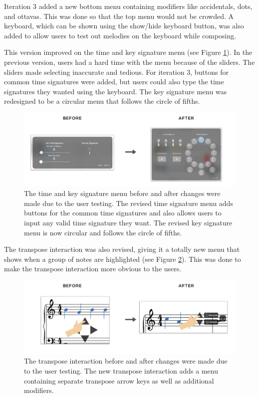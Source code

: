 				Iteration 3 added a new bottom menu containing modifiers like accidentals, dots, and ottavas. This was done so that the top menu would not be crowded. A keyboard, which can be shown using the show/hide keyboard button, was also added to allow users to test out melodies on the keyboard while composing. 

				This version improved on the time and key signature menu (see Figure \ref{fig:before-after-tsmenu}). In the previous version, users had a hard time with the menu because of the sliders. The sliders made selecting inaccurate and tedious. For iteration 3, buttons for common time signatures were added, but users could also type the time signatures they wanted using the keyboard. The key signature menu was redesigned to be a circular menu that follows the circle of fifths. 

				\begin{figure}[H]
					\centering
					\includegraphics[scale=0.28]{figures/before-after-tsmenu}
				    \caption{The time and key signature menu before and after changes were made due to the user testing. The revised time signature menu adds buttons for the common time signatures and also allows users to input any valid time signature they want. The revised key signature menu is now circular and follows the circle of fifths.}
				    \label{fig:before-after-tsmenu}
				\end{figure} 

				The transpose interaction was also revised, giving it a totally new menu that shows when a group of notes are highlighted (see Figure \ref{fig:before-after-transpose}). This was done to make the transpose interaction more obvious to the users.

				\begin{figure}[h]
					\centering
					\includegraphics[scale=0.25]{figures/before-after-transpose}
				    \caption{The transpose interaction before and after changes were made due to the user testing. The new transpose interaction adds a menu containing separate transpose arrow keys as well as additional modifiers.}
				    \label{fig:before-after-transpose}
				\end{figure}

